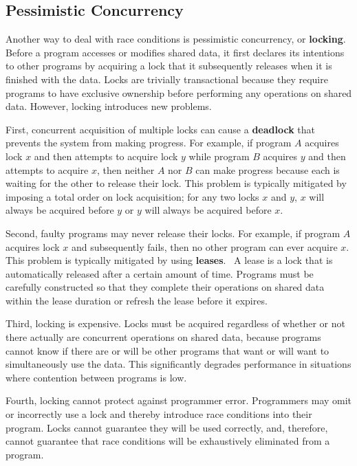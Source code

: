 \documentclass[../main.tex]{subfiles}
\begin{document}
  \subsection{Pessimistic Concurrency}
  Another way to deal with race conditions is pessimistic concurrency, or \textbf{locking}.
  Before a program accesses or modifies shared data, it first declares its intentions to other
  programs by acquiring a lock that it subsequently releases when it is finished with the data.
  Locks are trivially transactional because they require programs to have exclusive ownership before
  performing any operations on shared data. However, locking introduces new problems.

  First, concurrent acquisition of multiple locks can cause a \textbf{deadlock} that prevents the
  system from making progress. For example, if program $A$ acquires lock $x$ and then attempts to
  acquire lock $y$ while program $B$ acquires $y$ and then attempts to acquire $x$, then neither $A$
  nor $B$ can make progress because each is waiting for the other to release their lock. This
  problem is typically mitigated by imposing a total order on lock acquisition; for any two locks
  $x$ and $y$, $x$ will always be acquired before $y$ or $y$ will always be acquired before $x$.

  Second, faulty programs may never release their locks. For example, if program $A$ acquires lock
  $x$ and subsequently fails, then no other program can ever acquire $x$. This problem is typically
  mitigated by using \textbf{leases}.~\cite{leases} A lease is a lock that is automatically released
  after a certain amount of time. Programs must be carefully constructed so that they complete their
  operations on shared data within the lease duration or refresh the lease before it expires.

  Third, locking is expensive. Locks must be acquired regardless of whether or not there actually
  are concurrent operations on shared data, because programs cannot know if there are or will be
  other programs that want or will want to simultaneously use the data. This significantly degrades
  performance in situations where contention between programs is low.

  Fourth, locking cannot protect against programmer error. Programmers may omit or incorrectly use a
  lock and thereby introduce race conditions into their program. Locks cannot guarantee they will be
  used correctly, and, therefore, cannot guarantee that race conditions will be exhaustively
  eliminated from a program.
\end{document}
